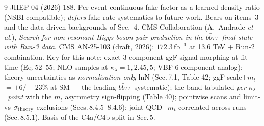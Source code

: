\documentclass[11pt]{article}
\newcommand{\kl}{\ensuremath{\kappa_\lambda}}
\newcommand{\bbtt}{\ensuremath{b\bar b\tau\tau}}
\begin{document}
\begin{thebibliography}{9}
  JHEP 04 (2026) 188. Per-event continuous fake factor as a learned density ratio (NSBI-compatible); \emph{defers}
  fake-rate systematics to future work. Bears on items~3 and the data-driven backgrounds of Sec.~4.
 CMS Collaboration (A.~Andrade \emph{et al.}), \emph{Search for non-resonant Higgs boson pair
  production in the \bbtt\ final state with Run-3 data}, CMS AN-25-103 (draft, 2026); $172.3\,\mathrm{fb}^{-1}$
  at 13.6 TeV $+$ Run-2 combination. Key for this note: exact 3-component ggF signal morphing at fit time
  (Eq.\,52--55; NLO samples at $\kl=1,2.45,5$; VBF 6-component analog); theory uncertainties as
  \emph{normalisation-only} lnN (Sec.\,7.1, Table 42; ggF scale$+m_t$ $=+6/-23\%$ at SM --- the leading \bbtt\
  systematic); the band tabulated \emph{per \kl\ point} with the $m_t$ asymmetry sign-flipping (Table 40);
  pointwise scans and limit-vs-$\sigma_{\rm theory}$ exclusions (Secs.\,8.4.5--8.4.6); joint QCD$+m_t$ correlated
  across runs (Sec.\,8.5.1). Basis of the C4a/C4b split in Sec.\,5.
\end{thebibliography}
\end{document}
